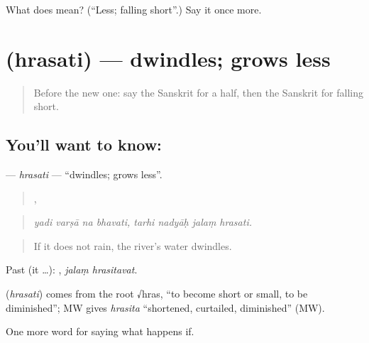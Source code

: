 \begin{tcolorbox}[breakable,colback=teal!4,colframe=teal!35!black,title={Before you move on}]
What does  mean? (\textquotedblleft{}Less; falling short\textquotedblright{}.) Say it once more.
\end{tcolorbox}
\section[\texorpdfstring{\sk{ह्रसति} (hrasati)}{ह्रसति (hrasati)}]{ (hrasati) — dwindles; grows less}

\label{lesson:SA-C378-hrasati}



\begin{quote}
Before the new one: say the Sanskrit for a half, then the Sanskrit for falling short.
\end{quote}

\subsection*{You'll want to know: }
\textbf{} — \emph{hrasati} — \textquotedblleft{}dwindles; grows less\textquotedblright{}.

\begin{quote}
   ,    
\end{quote}

\begin{quote}
\emph{yadi varṣā na bhavati, tarhi nadyāḥ jalaṃ hrasati.}
\end{quote}

\begin{quote}
If it does not rain, the river's water dwindles.
\end{quote}

Past (it …):  , \emph{jalaṃ hrasitavat}.

\begin{cousinweb}
\textbf{} (\emph{hrasati}) comes from the root √hras, \textquotedblleft{}to become short or small, to be diminished\textquotedblright{}; MW gives \emph{hrasita} \textquotedblleft{}shortened, curtailed, diminished\textquotedblright{} (MW).
\end{cousinweb}

\begin{grammarlens}[title={What you've built}]
One more word for saying what happens if.
\end{grammarlens}

